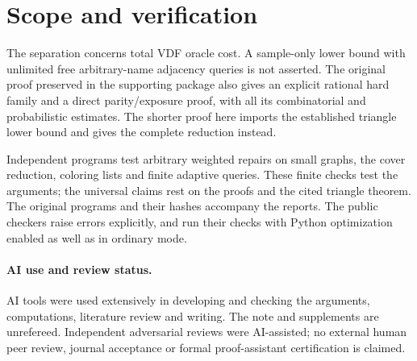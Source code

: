 \documentclass[11pt]{article}
\begin{document}
\section{Scope and verification}
The separation concerns total VDF oracle cost. A sample-only lower
bound with unlimited free arbitrary-name adjacency queries is not
asserted. The original proof preserved in the supporting package also
gives an explicit rational hard family and a direct parity/exposure
proof, with all its combinatorial and probabilistic estimates.
The shorter proof here imports the established triangle lower bound
and gives the complete reduction instead.

Independent programs test arbitrary weighted repairs on small graphs,
the cover reduction, coloring lists and finite adaptive queries.
These finite checks test the arguments; the universal claims rest on
the proofs and the cited triangle theorem. The original programs and their hashes accompany the reports.
The public checkers raise errors explicitly, and run their checks
with Python optimization enabled as well as in ordinary mode.

\paragraph{AI use and review status.}
AI tools were used extensively in developing and checking the
arguments, computations, literature review and writing. The note and
supplements are unrefereed. Independent adversarial reviews were
AI-assisted; no external human peer review, journal acceptance or
formal proof-assistant certification is claimed.
\end{document}

